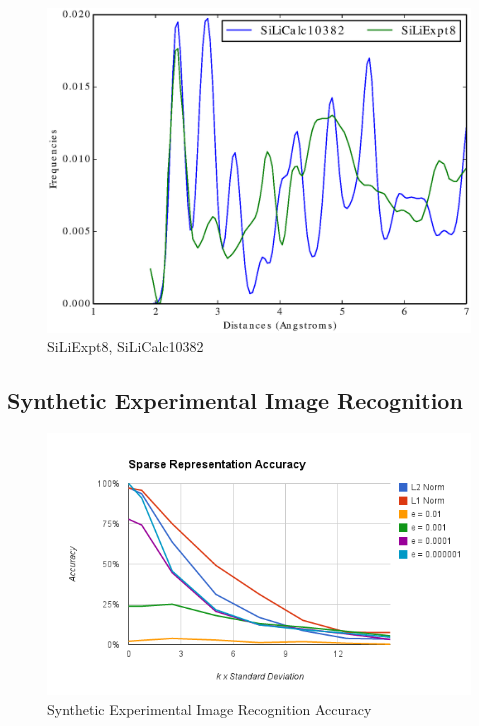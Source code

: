 \documentclass[12pt,letterpaper]{article}
\begin{document}
\begin{figure}[ht]
  \begin{center}
    \includegraphics[scale=0.8]{figs/SparseRepSiLiExpt8-SiLiCalc10382.eps}
    \caption{SiLiExpt8, SiLiCalc10382}
  \end{center}
\end{figure}
\clearpage

\subsection{Synthetic Experimental Image Recognition}
\begin{figure}[ht]
  \begin{center}
    \includegraphics[scale=0.8]{figs/SparseRepSynthExprAccuracy.png}
    \caption{Synthetic Experimental Image Recognition Accuracy}
  \end{center}
\end{figure}
\clearpage
\end{document}
